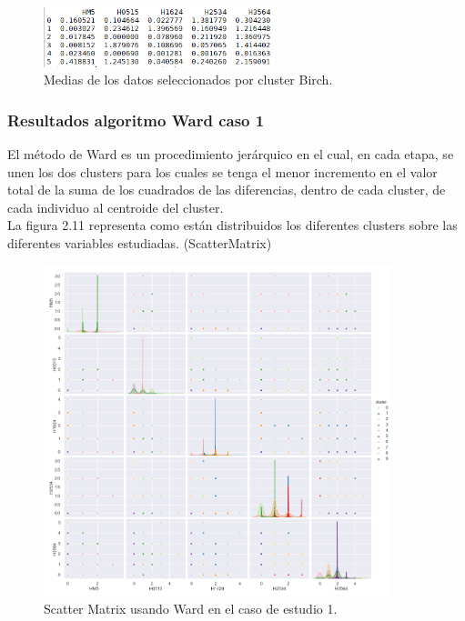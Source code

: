 	\begin{figure}[htb]
		\centering
		\includegraphics[width=0.6\textwidth]{./imagenes/caso1/medias_datos_caso1_Birch}
		\caption{Medias de los datos seleccionados por cluster Birch.} \label{fig:1}
	\end{figure}


	\subsubsection{Resultados algoritmo Ward caso 1}

	El método de Ward es un procedimiento jerárquico en el cual, en cada etapa, 
	se unen los dos clusters para los cuales se tenga el menor incremento en el valor 
	total de la suma de los cuadrados de las diferencias,
	dentro de cada cluster, de cada individuo al centroide del cluster. \\


	La figura 2.11 representa como están distribuidos los diferentes clusters sobre las diferentes variables estudiadas. (ScatterMatrix)\\

	\begin{figure}[htb]
		\centering
		\includegraphics[width=0.9\textwidth]{./imagenes/caso1/scatterMatrix_caso1_Ward}
		\caption{Scatter Matrix usando Ward en el caso de estudio 1.} \label{fig:1}
	\end{figure}

